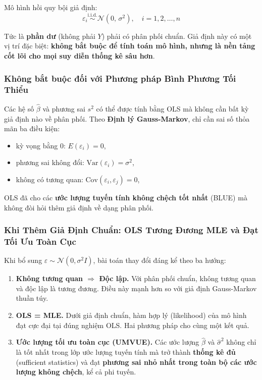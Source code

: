 \documentclass[12pt, a4paper]{article}
\begin{document}
Mô hình hồi quy bội giả định:
\[
  \varepsilon_i \overset{\text{i.i.d.}}{\sim} \mathcal{N}(0,\, \sigma^2), \quad i = 1, 2, \ldots, n
\]

Tức là \textbf{phần dư} (không phải $Y$) phải có phân phối chuẩn. Giả định này có một vị trí đặc biệt: \textbf{không bắt buộc để tính toán mô hình, nhưng là nền tảng cốt lõi cho mọi suy diễn thống kê sâu hơn}.

\subsubsection{Không bắt buộc đối với Phương pháp Bình Phương Tối Thiểu}

Các hệ số $\hat{\beta}$ và phương sai $s^2$ có thể được tính bằng OLS mà không cần bất kỳ giả định nào về phân phối. Theo \textbf{Định lý Gauss-Markov}, chỉ cần sai số thỏa mãn ba điều kiện:
\begin{itemize}
  \item kỳ vọng bằng 0: $E(\varepsilon_i) = 0$,
  \item phương sai không đổi: $\mathrm{Var}(\varepsilon_i) = \sigma^2$,
  \item không có tương quan: $\mathrm{Cov}(\varepsilon_i, \varepsilon_j) = 0$,
\end{itemize}
OLS đã cho các \textbf{ước lượng tuyến tính không chệch tốt nhất} (BLUE) mà không đòi hỏi thêm giả định về dạng phân phối.

\subsubsection{Khi Thêm Giả Định Chuẩn: OLS Tương Đương MLE và Đạt Tối Ưu Toàn Cục}

Khi bổ sung $\varepsilon \sim \mathcal{N}(0, \sigma^2 I)$, bài toán thay đổi đáng kể theo ba hướng:

\begin{enumerate}
  \item \textbf{Không tương quan $\Rightarrow$ Độc lập.} Với phân phối chuẩn, không tương quan và độc lập là tương đương. Điều này mạnh hơn so với giả định Gauss-Markov thuần túy.
  \item \textbf{OLS = MLE.} Dưới giả định chuẩn, hàm hợp lý (likelihood) của mô hình đạt cực đại tại đúng nghiệm OLS. Hai phương pháp cho cùng một kết quả.
  \item \textbf{Ước lượng tối ưu toàn cục (UMVUE).} Các ước lượng $\hat{\beta}$ và $\hat{\sigma}^2$ không chỉ là tốt nhất trong lớp ước lượng tuyến tính mà trở thành \textbf{thống kê đủ} (sufficient statistics) và đạt \textbf{phương sai nhỏ nhất trong toàn bộ các ước lượng không chệch}, kể cả phi tuyến.
\end{enumerate}
\end{document}
